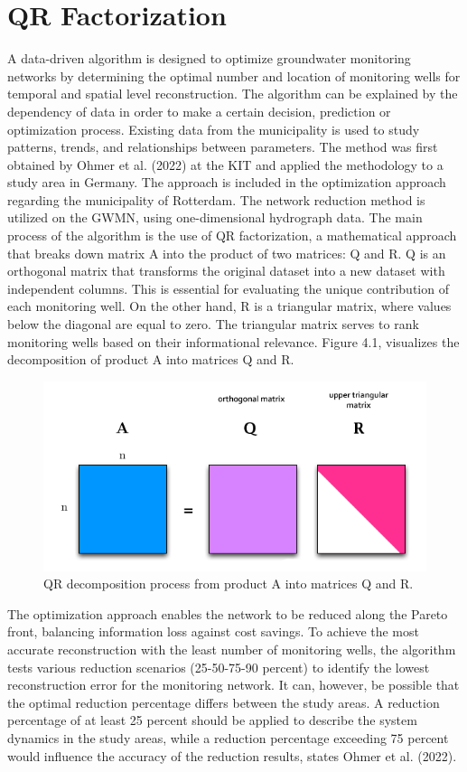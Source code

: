 \section{QR Factorization}
A data-driven algorithm is designed to optimize groundwater monitoring networks by determining the optimal number and location of monitoring wells for temporal and spatial level reconstruction. The algorithm can be explained by the dependency of data in order to make a certain decision, prediction or optimization process. Existing data from the municipality is used to study patterns, trends, and relationships between parameters. The method was first obtained by Ohmer et al. (2022) at the KIT and applied the methodology to a study area in Germany. The approach is included in the optimization approach regarding the municipality of Rotterdam. The network reduction method is utilized on the GWMN, using one-dimensional hydrograph data. The main process of the algorithm is the use of QR factorization, a mathematical approach that breaks down matrix A into the product of two matrices: Q and R. Q is an orthogonal matrix that transforms the original dataset into a new dataset with independent columns. This is essential for evaluating the unique contribution of each monitoring well. On the other hand, R is a triangular matrix, where values below the diagonal are equal to zero. The triangular matrix serves to rank monitoring wells based on their informational relevance. Figure 4.1, visualizes the decomposition of product A into matrices Q and R. 

\begin{figure}[htbp]
    \centering
    \includegraphics[width=0.40\linewidth]{figures/figures theory/qr rank.png}
    \caption{QR decomposition process from product A into matrices Q and R.}
\end{figure}

The optimization approach enables the network to be reduced along the Pareto front, balancing information loss against cost savings. To achieve the most accurate reconstruction with the least number of monitoring wells, the algorithm tests various reduction scenarios (25-50-75-90 percent) to identify the lowest reconstruction error for the monitoring network. It can, however, be possible that the optimal reduction percentage differs between the study areas. A reduction percentage of at least 25 percent should be applied to describe the system dynamics in the study areas, while a reduction percentage exceeding 75 percent would influence the accuracy of the reduction results, states Ohmer et al. (2022). 

